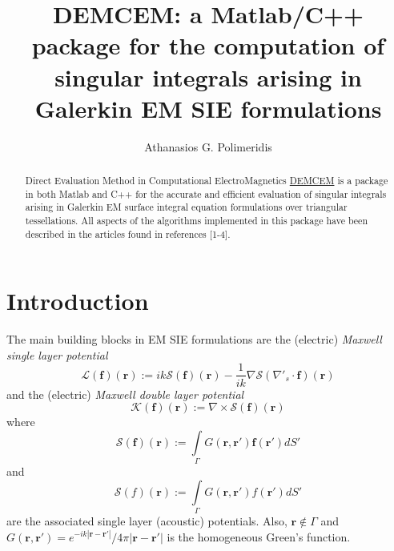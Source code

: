 \documentclass[a4wide,11pt]{article}
\date{}
\renewcommand{\vec}[1]{\mathbf{#1}}
\newcommand{\bc}[1]{\boldsymbol{\mathcal{#1}}}
\begin{document}
\title{DEMCEM: a Matlab/C++ package for the computation of singular integrals arising in Galerkin EM SIE formulations }
\author{%
Athanasios G. Polimeridis}

\maketitle

\thispagestyle{empty}

\begin{abstract}
Direct Evaluation Method in Computational ElectroMagnetics \href{http://lema.epfl.ch/Members/thanos/Software.html}{DEMCEM} is a package in both Matlab and C++ for the accurate and efficient evaluation of singular integrals arising in Galerkin EM surface integral equation formulations over triangular tessellations. All aspects of the algorithms implemented in this package have been described in the articles found in references [1-4].
\end{abstract}

\section{Introduction}

The main building blocks in EM SIE formulations are the (electric) \textit{Maxwell single layer potential}
\begin{equation}
\bc{L}(\vec{f})(\vec{r}) := ik\bc{S}(\vec{f})(\vec{r}) - \frac{1}{ik} \nabla \mathcal{S}(\nabla'_s \cdot \vec{f})(\vec{r})
\end{equation}
and the (electric) \textit{Maxwell double layer potential}
\begin{equation}
\bc{K}(\vec{f})(\vec{r}) := \nabla\times\bc{S}(\vec{f})(\vec{r})
\end{equation}
where
\begin{equation}
\bc{S}(\vec{f})(\vec{r}) := \int\limits_\Gamma G(\vec{r},\vec{r'}) \vec{f}(\vec{r'}) dS'
\end{equation}
and
\begin{equation}
\mathcal{S}(f)(\vec{r}) := \int\limits_\Gamma G(\vec{r},\vec{r'}) f(\vec{r'}) dS'
\end{equation}
are the associated single layer (acoustic) potentials. Also, $\vec{r}\notin \Gamma$ and $G(\vec{r},\vec{r'})= e^{-ik|\vec{r}-\vec{r'}|} / 4\pi|\vec{r}-\vec{r'}|$ is the homogeneous Green's function.
\end{document}
